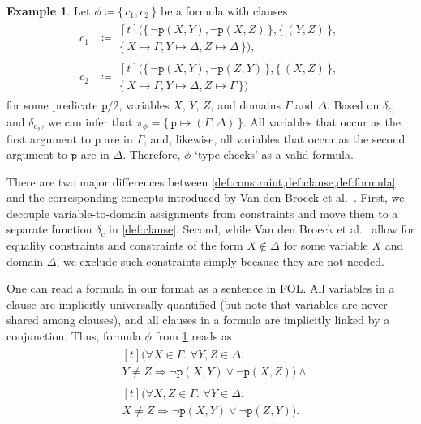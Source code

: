 \documentclass{article}
\theoremstyle{definition}
\newtheorem{example}{Example}
\begin{document}
\begin{example}\label{example:first}
  Let $\phi \coloneqq \{\, c_1, c_2 \,\}$ be a formula with clauses
  \begin{align*}
    c_1 &\coloneqq
          \begin{multlined}[t]
            (\{\, \neg \texttt{p}(X, Y), \neg \texttt{p}(X, Z) \,\}, \{\, (Y, Z) \,\}, \\
            \{\, X \mapsto \Gamma, Y \mapsto \Delta, Z \mapsto \Delta \,\}),
          \end{multlined}\\
    c_2 &\coloneqq
          \begin{multlined}[t]
            (\{\, \neg \texttt{p}(X, Y), \neg \texttt{p}(Z, Y) \,\}, \{\, (X, Z) \,\}, \\
            \{\, X \mapsto \Gamma, Y \mapsto \Delta, Z \mapsto \Gamma \,\})
          \end{multlined}
  \end{align*}
  for some predicate $\texttt{p}/2$, variables $X$, $Y$, $Z$, and domains
  $\Gamma$ and $\Delta$. Based on $\delta_{c_{1}}$ and $\delta_{c_{2}}$, we can
  infer that $\pi_{\phi} = \{\, \texttt{p} \mapsto (\Gamma, \Delta) \,\}$. All
  variables that occur as the first argument to $\texttt{p}$ are in $\Gamma$,
  and, likewise, all variables that occur as the second argument to $\texttt{p}$
  are in $\Delta$. Therefore, $\phi$ `type checks' as a valid formula.
\end{example}

There are two major differences between
\cref{def:constraint,def:clause,def:formula} and the corresponding concepts
introduced by Van den Broeck et al.~.
First, we decouple variable-to-domain assignments from constraints and move them
to a separate function $\delta_{c}$ in \cref{def:clause}. Second, while Van den
Broeck et al.~ allow for equality
constraints and constraints of the form $X \not\in \Delta$ for some variable $X$
and domain $\Delta$, we exclude such constraints simply because they are not
needed.

One can read a formula in our format as a sentence in FOL\@. All variables in a
clause are implicitly universally quantified (but note that variables are never
shared among clauses), and all clauses in a formula are implicitly linked by a
conjunction. Thus, formula $\phi$ from \cref{example:first} reads as
\begin{align*}
  &\begin{multlined}[t]
    (\forall X \in \Gamma\text{. }\forall Y, Z \in \Delta\text{. }\\
    Y \ne Z \Rightarrow \neg \texttt{p}(X, Y) \lor \neg \texttt{p}(X, Z)) \land
    \end{multlined}\\
  &\begin{multlined}[t]
    (\forall X, Z \in \Gamma\text{. }\forall Y \in \Delta\text{. }\\
    X \ne Z \Rightarrow \neg \texttt{p}(X, Y) \lor \neg \texttt{p}(Z, Y)).
    \end{multlined}
\end{align*}
\end{document}
